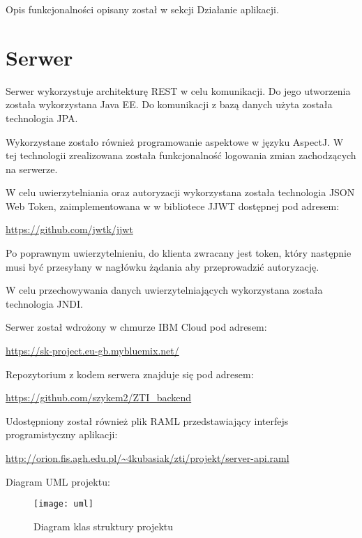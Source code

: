 \documentclass[11pt, titlepage]{article}
\begin{document}
Opis funkcjonalności opisany został w sekcji Działanie aplikacji.

\break

\section{Serwer}
\hspace{11pt} Serwer wykorzystuje architekturę REST w celu komunikacji. Do jego utworzenia została wykorzystana Java EE. Do komunikacji z bazą danych użyta została technologia JPA.

Wykorzystane zostało również programowanie aspektowe w języku AspectJ. W tej technologii zrealizowana została funkcjonalność logowania zmian zachodzących na serwerze.

W celu uwierzytelniania oraz autoryzacji wykorzystana została technologia JSON Web Token, zaimplementowana w w bibliotece JJWT dostępnej pod adresem:
\begin{center}
\url{https://github.com/jwtk/jjwt}
\end{center}

Po poprawnym uwierzytelnieniu, do klienta zwracany jest token, który następnie musi być przesyłany w nagłówku żądania aby przeprowadzić autoryzację.

W celu przechowywania danych uwierzytelniających wykorzystana została technologia JNDI.

Serwer został wdrożony w chmurze IBM Cloud pod adresem:
\begin{center}
\url{https://sk-project.eu-gb.mybluemix.net/}
\end{center}

Repozytorium z kodem serwera znajduje się pod adresem:
\begin{center}
\url{https://github.com/szykem2/ZTI_backend}
\end{center}

Udostępniony został również plik RAML przedstawiający interfejs programistyczny aplikacji:
\begin{center}
\begin{adjustwidth}{-0.0cm}{}
\url{http://orion.fis.agh.edu.pl/~4kubasiak/zti/projekt/server-api.raml}
\end{adjustwidth}
\end{center}


\break

Diagram UML projektu:
\begin{figure}[H]
\caption{Diagram klas struktury projektu}
\begin{adjustwidth}{-3cm}{}
\texttt{[image: uml]}
\end{adjustwidth}
\end{figure}
\end{document}

